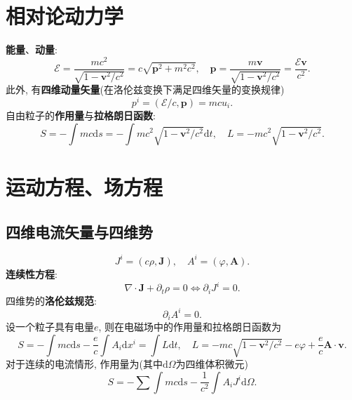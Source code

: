 \documentclass{article}
\newcommand\del{\partial}
\newcommand\bo[1]{\boldsymbol{#1}}
\renewcommand\d{\mathrm{d}}
\begin{document}
\section{相对论动力学}
\textbf{能量}、\textbf{动量}:
\[\mathcal{E}=\frac{mc^2}{\sqrt{1-\bo{v}^2/c^2}}=c\sqrt{\bo{p}^2+m^2c^2},\quad \bo{p}=\frac{m \bo{v}}{\sqrt{1-\bo{v}^2/c^2}}=\frac{\mathcal{E}\bo{v}}{c^2}.\]
此外, 有\textbf{四维动量矢量}(在洛伦兹变换下满足四维矢量的变换规律)
\[p^i=(\mathcal{E}/c,\bo{p})=mc u_i.\]
自由粒子的\textbf{作用量}与\textbf{拉格朗日函数}:
\[S=-\int mc\d s=-\int mc^2\sqrt{1-\bo{v}^2/c^2}\d t,\quad L=-mc^2\sqrt{1-\bo{v}^2/c^2}.\]

\section{运动方程、场方程}
\subsection{四维电流矢量与四维势}
\[J^i=(c\rho,\bo{J}),\quad A^i=(\varphi,\bo{A}).\]
\textbf{连续性方程}:
\[\nabla\cdot\bo{J}+\del_t\rho=0\Leftrightarrow\del_iJ^i=0.\]
四维势的\textbf{洛伦兹规范}:
\[\del_iA^i=0.\]
设一个粒子具有电量$e$, 则在电磁场中的作用量和拉格朗日函数为
\[S=-\int mc\d s-\frac{e}{c}\int A_i\d x^i=\int L\d t,\quad L=-mc\sqrt{1-\bo{v}^2/c^2}-e\varphi+\frac{e}{c}\bo{A}\cdot\bo{v}.\]
对于连续的电流情形, 作用量为(其中$\d\Omega$为四维体积微元)
\[S=-\sum\int mc\d s-\frac{1}{c^2}\int A_iJ^i\d\Omega.\]
\end{document}
